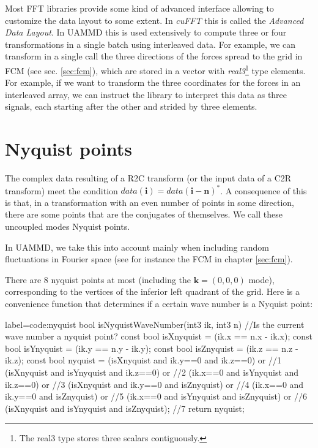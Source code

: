 \documentclass[ twoside,openright,titlepage,numbers=noenddot,%
headinclude,footinclude,cleardoublepage=empty,abstract=on,
BCOR=5mm,paper=b5,fontsize=11pt, dvipsnames
]{scrreprt}
\renewcommand{\vec}[1]{\bm{#1}}
\newcommand{\uammd}{\gls{UAMMD}\xspace}
\begin{document}
Most \gls{FFT} libraries provide some kind of advanced interface allowing to customize the data layout to some extent. In \emph{cuFFT} this is called the \emph{Advanced Data Layout}. In \uammd this is used extensively to compute three or four transformations in a single batch using interleaved data. For example, we can transform in a single call the three directions of the forces spread to the grid in \gls{FCM} (see sec. \ref{sec:fcm}), which are stored in a vector with \emph{real3}\footnote{The real3 type stores three scalars contiguously.} type elements.
For example, if we want to transform the three coordinates for the forces in an interleaved array, we can instruct the library to interpret this data as three signals, each starting after the other and strided by three elements.
\section*{Nyquist points}
The complex data resulting of a R2C transform (or the input data of a C2R transform) meet the condition $data(\vec{i}) = data(\vec{i} - \vec{n})^*$. A consequence of this is that, in a transformation with an even number of points in some direction, there are some points that are the conjugates of themselves. We call these uncoupled modes Nyquist points.

In \uammd, we take this into account mainly when including random fluctuations in Fourier space (see for instance the \gls{FCM} in chapter \ref{sec:fcm}).

There are $8$ nyquist points at most (including the $\vec{k} = (0,0,0)$ mode), corresponding to the vertices of the inferior left quadrant of the grid.
Here is a convenience function that determines if a certain wave number is a Nyquist point:
\begin{code2}{label=code:nyquist}  
bool isNyquistWaveNumber(int3 ik, int3 n){
  //Is the current wave number a nyquist point?
  const bool isXnyquist = (ik.x == n.x - ik.x);
  const bool isYnyquist = (ik.y == n.y - ik.y);
  const bool isZnyquist = (ik.z == n.z - ik.z);
  const bool nyquist =  
    (isXnyquist and ik.y==0    and ik.z==0)    or //1
    (isXnyquist and isYnyquist and ik.z==0)    or //2
    (ik.x==0    and isYnyquist and ik.z==0)    or //3
    (isXnyquist and ik.y==0    and isZnyquist) or //4
    (ik.x==0    and ik.y==0    and isZnyquist) or //5
    (ik.x==0    and isYnyquist and isZnyquist) or //6
    (isXnyquist and isYnyquist and isZnyquist);   //7
  return nyquist;
}
\end{code2}
\end{document}

